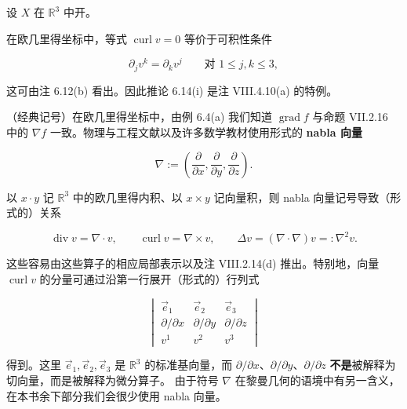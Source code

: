 \begin{remark}

设 $ X $ 在 $ \mathbb{R}^{3} $ 中开。

\begin{items}
\item

在欧几里得坐标中，等式 $ \operatorname{curl} v = 0 $ 等价于可积性条件

\[
\partial_{j} v^{k} = \partial_{k} v^{j} \qquad \text{对 } 1 \le j, k \le 3 ,
\]

这可由注 6.12(b) 看出。因此推论 6.14(i) 是注 VIII.4.10(a) 的特例。

\item

（经典记号）在欧几里得坐标中，由例 6.4(a) 我们知道 $ \operatorname{grad} f $ 与命题 VII.2.16 中的 $ \nabla f $ 一致。物理与工程文献以及许多数学教材使用形式的 \textbf{nabla 向量}

\[
\nabla := \left( \frac{\partial}{\partial x}, \frac{\partial}{\partial y}, \frac{\partial}{\partial z} \right) .
\]

以 $ x \cdot y $ 记 $ \mathbb{R}^{3} $ 中的欧几里得内积、以 $ x \times y $ 记向量积，则 nabla 向量记号导致（形式的）关系

\[
\operatorname{div} v = \nabla \cdot v , \qquad \operatorname{curl} v = \nabla \times v , \qquad \Delta v = (\nabla \cdot \nabla) v =: \nabla^{2} v .
\]

这些容易由这些算子的相应局部表示以及注 VIII.2.14(d) 推出。特别地，向量 $ \operatorname{curl} v $ 的分量可通过沿第一行展开（形式的）行列式

\begin{equation*}
\begin{vmatrix} \vec{e}_{1} & \vec{e}_{2} & \vec{e}_{3} \\ \partial/\partial x & \partial/\partial y & \partial/\partial z \\ v^{1} & v^{2} & v^{3} \end{vmatrix}
\end{equation*}

得到。这里 $ \vec{e}_{1}, \vec{e}_{2}, \vec{e}_{3} $ 是 $ \mathbb{R}^{3} $ 的标准基向量，而 $ \partial/\partial x $、$ \partial/\partial y $、$ \partial/\partial z $ \textbf{不是}被解释为切向量，而是被解释为微分算子。
由于符号 $ \nabla $ 在黎曼几何的语境中有另一含义，在本书余下部分我们会很少使用 nabla 向量。

\end{items}



\end{remark}
